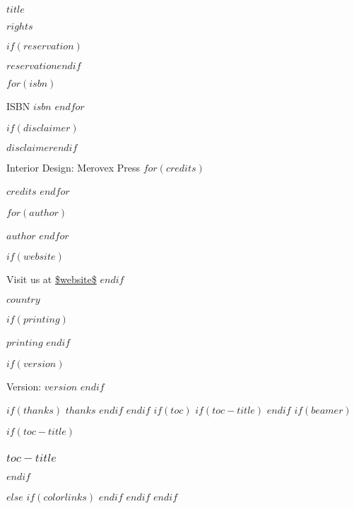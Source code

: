 \documentclass[$if(fontsize)$$fontsize$,$endif$$if(lang)$$babel-lang$,$endif$$if(papersize)$$papersize$paper,$endif$$if(beamer)$ignorenonframetext,$if(handout)$handout,$endif$$if(aspectratio)$aspectratio=$aspectratio$,$endif$$endif$$for(classoption)$$classoption$$sep$,$endfor$]{$documentclass$}
\begin{document}
  \vspace*{\fill}

  \par\noindent\emph{$title$}\newline
  \par\noindent\emph{$rights$}\newline

  \footnotesize
  $if(reservation)$\par\noindent $reservation$\newline$endif$

  $for(isbn)$
    \par\noindent ISBN $isbn$
  $endfor$\newline

  \footnotesize
  $if(disclaimer)$\par\noindent $disclaimer$\newline$endif$

  \par\noindent Interior Design: Merovex Press %
  $for(credits)$
    \par\noindent $credits$
  $endfor$\newline

  \par\noindent $for(author)$
      \par\noindent $author$
    $endfor$\newline

  $if(website)$
    \par\noindent Visit us at \url{$website$}\newline
  $endif$

  \par\noindent $country$
  \newline

  $if(printing)$
    \par\noindent\textit{$printing$}
    \newline
  $endif$

  $if(version)$
  \par\noindent Version: $version$
  $endif$
  \vspace*{\fill}
  \clearpage\normalsize

  $if(thanks)$
    $thanks$
    \newpage
  $endif$
$endif$
  $if(toc)$
    $if(toc-title)$
      \renewcommand*\contentsname{$toc-title$}
    $endif$
    $if(beamer)$
      \begin{frame}
        $if(toc-title)$
        \frametitle{$toc-title$}
        $endif$
        \tableofcontents[hideallsubsections]
      \end{frame}
    $else$
    {
      $if(colorlinks)$
        \hypersetup{linkcolor=$if(toccolor)$$toccolor$$else$$endif$}
      $endif$
      \setcounter{tocdepth}{$toc-depth$}
      \tableofcontents
    }
    $endif$
  $endif$
\end{document}
